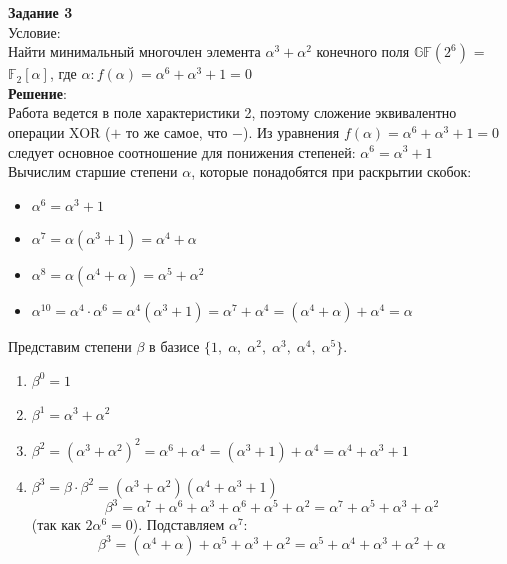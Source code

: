 \documentclass[12pt]{article}
\begin{document}
\begin{flushleft}
\end{flushleft}


\newpage


\begin{flushleft}
    \textbf{Задание 3} \\
    Условие: \\
    Найти минимальный многочлен элемента $\alpha^3 + \alpha^2$ конечного поля $\mathbb{GF}(2^6)$ =
    $\mathbb{F}_2 [\alpha]$, где $\alpha: f (\alpha) = \alpha^6 + \alpha^3 + 1 = 0 $ \\
    
    \vspace{20pt}
    \textbf{Решение}: \\
    Работа ведется в поле характеристики 2, поэтому сложение эквивалентно операции XOR ($+$ то же самое, что $-$).
    Из уравнения $f(\alpha) = \alpha^6 + \alpha^3 + 1 = 0$ следует основное соотношение для понижения степеней: $\alpha^6 = \alpha^3 + 1$ \\

    Вычислим старшие степени $\alpha$, которые понадобятся при раскрытии скобок:
    \begin{itemize}
    \item $\alpha^6 = \alpha^3 + 1 $ \\
    \item $\alpha^7 = \alpha(\alpha^3 + 1) = \alpha^4 + \alpha $ \\
    \item $\alpha^8 = \alpha(\alpha^4 + \alpha) = \alpha^5 + \alpha^2 $ \\
    \item $\alpha^{10} = \alpha^4 \cdot \alpha^6 = \alpha^4(\alpha^3+1) = \alpha^7 + \alpha^4 = (\alpha^4+\alpha) + \alpha^4 = \alpha $ \\
    \end{itemize}

    Представим степени $\beta$ в базисе $\{1, \; \alpha, \; \alpha^2, \; \alpha^3, \; \alpha^4, \; \alpha^5\}$.

    \begin{enumerate}
        \item $\beta^0 = 1$
        \item $\beta^1 = \alpha^3 + \alpha^2$
        \item $\beta^2 = (\alpha^3 + \alpha^2)^2 = \alpha^6 + \alpha^4 = (\alpha^3 + 1) + \alpha^4 = \alpha^4 + \alpha^3 + 1 $ \\
        \item $\beta^3 = \beta \cdot \beta^2 = (\alpha^3 + \alpha^2)(\alpha^4 + \alpha^3 + 1)$ \\
        $$ \beta^3 = \alpha^7 + \alpha^6 + \alpha^3 + \alpha^6 + \alpha^5 + \alpha^2 = \alpha^7 + \alpha^5 + \alpha^3 + \alpha^2 $$
        (так как $2\alpha^6 = 0$). Подставляем $\alpha^7$:
        $$ \beta^3 = (\alpha^4 + \alpha) + \alpha^5 + \alpha^3 + \alpha^2 = \alpha^5 + \alpha^4 + \alpha^3 + \alpha^2 + \alpha $$
        

\end{enumerate}
\end{flushleft}
\end{document}
